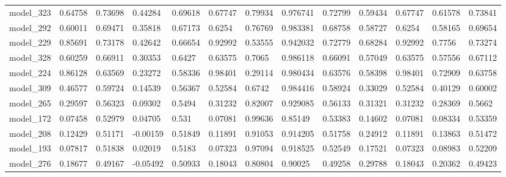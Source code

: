 \begin{tabular}{lllllllllllll}
model\_323     & 0.64758     & 0.73698        & 0.44284      & 0.69618          & 0.67747              & 0.79934              & 0.976741     & 0.72799           & 0.59434            & 0.67747         & 0.61578     & 0.73841      \\
model\_292     & 0.60011     & 0.69471        & 0.35818      & 0.67173          & 0.6254               & 0.76769              & 0.983381     & 0.68758           & 0.58727            & 0.6254          & 0.58165     & 0.69654      \\
model\_229     & 0.85691     & 0.73178        & 0.42642      & 0.66654          & 0.92992              & 0.53555              & 0.942032     & 0.72779           & 0.68284            & 0.92992         & 0.7756      & 0.73274      \\
model\_328     & 0.60259     & 0.66911        & 0.30353      & 0.6427           & 0.63575              & 0.7065               & 0.986118     & 0.66091           & 0.57049            & 0.63575         & 0.57556     & 0.67112      \\
model\_224     & 0.86128     & 0.63569        & 0.23272      & 0.58336          & 0.98401              & 0.29114              & 0.980434     & 0.63576           & 0.58398            & 0.98401         & 0.72909     & 0.63758      \\
model\_309     & 0.46577     & 0.59724        & 0.14539      & 0.56367          & 0.52584              & 0.6742               & 0.984416     & 0.58924           & 0.33029            & 0.52584         & 0.40129     & 0.60002      \\
model\_265     & 0.29597     & 0.56323        & 0.09302      & 0.5494           & 0.31232              & 0.82007              & 0.929085     & 0.56133           & 0.31321            & 0.31232         & 0.28369     & 0.5662       \\
model\_172     & 0.07458     & 0.52979        & 0.04705      & 0.531            & 0.07081              & 0.99636              & 0.85149      & 0.53383           & 0.14602            & 0.07081         & 0.08334     & 0.53359      \\
model\_208     & 0.12429     & 0.51171        & -0.00159     & 0.51849          & 0.11891              & 0.91053              & 0.914205     & 0.51758           & 0.24912            & 0.11891         & 0.13863     & 0.51472      \\
model\_193     & 0.07817     & 0.51838        & 0.02019      & 0.5183           & 0.07323              & 0.97094              & 0.918525     & 0.52549           & 0.17521            & 0.07323         & 0.08983     & 0.52209      \\
model\_276     & 0.18677     & 0.49167        & -0.05492     & 0.50933          & 0.18043              & 0.80804              & 0.90025      & 0.49258           & 0.29788            & 0.18043         & 0.20362     & 0.49423
\end{tabular}